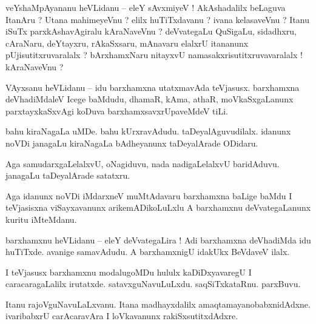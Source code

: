 \documentclass{article}
\begin{document}

\begin{mng}%
veYshaMpAyananu heVLidanu -- eleY sAvxmiyeV ! AkAshadalilx beLaguva ItanAru ? Utana mahimeyeVnu ? 
elilx huTiTxdavanu ? ivana kelasaveVnu ? Itanu iSuTx parxkAshavAgiralu kAraNaveVnu ? deVvategaLu 
QuSigaLu, sidadhxru, cAraNaru, deYtayxru, rAkaSxsaru, mAnavaru elalxrU itananunx 
pUjisutitxruvaralalx ? bArxhamxNaru nitayxvU namasakxrisutitxruvavaralalx ! kAraNaveVnu ?
\end{mng}

\begin{mng}%
VAyxsanu heVLidanu -- idu barxhamxna utatxmavAda teVjasusx. barxhamxna deVhadiMdaleV Icege 
baMdudu, dhamaR, kAma, athaR, moVkaSxgaLanunx parxtayxkaSxvAgi koDuva barxhamxsavxrUpaveMdeV tiLi.
\end{mng}

\begin{mng}%
bahu kiraNagaLa uMDe. bahu kUrxravAdudu. taDeyalAguvudilalx. idanunx noVDi janagaLu kiraNagaLa 
bAdheyanunx taDeyalArade ODidaru.
\end{mng}

\begin{mng}%
Aga samudarxgaLelalxvU, oNagiduvu, nada nadigaLelalxvU baridAduvu. janagaLu taDeyalArade satatxru.
\end{mng}

\begin{mng}%
Aga idanunx noVDi iMdarxneV muMtAdavaru barxhamxna baLige  baMdu I teVjasisxna viSayxavanunx 
arikemADikoLuLxlu A barxhamxnu deVvategaLanunx kuritu iMteMdanu.
\end{mng}

\begin{mng}%
barxhamxnu heVLidanu -- eleY deVvategaLira ! Adi barxhamxna deVhadiMda idu huTiTxde. avanige 
samavAdudu. A barxhamxnigU idakUkx BeVdaveV ilalx.
\end{mng}

\begin{mng}%
I teVjasusx barxhamxnu modalugoMDu hululx kaDiDxyavaregU I caracaragaLalilx irutatxde. 
satavxguNavuLuLxdu. saqSiTxkataRnu. parxBuvu.
\end{mng}

\begin{mng}%
Itanu rajoVguNavuLaLxvanu. Itana madhayxdalilx amaqtamayanobabxnidAdxne. ivaribabxrU carAcaravAra 
I loVkavanunx rakiSxsutitxdAdxre.
\end{mng}
\end{document}
